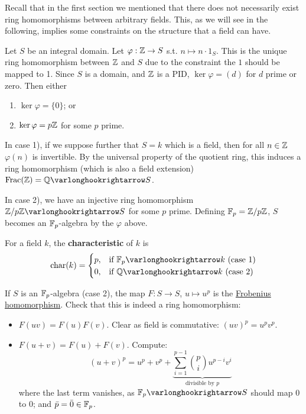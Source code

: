 \documentclass{article}
\begin{document}
\textstart
Recall that in the first section we mentioned that there does not necessarily exist ring homomorphisms between arbitrary fields. This, as we will see in the following, implies some constraints on the structure that a field can have.

Let $S$ be an integral domain. Let $\varphi: \mathbb{Z} \to S$ s.t. $n \mapsto n \cdot 1_S$. This is the unique ring homomorphism between $\mathbb{Z}$ and $S$ due to the constraint the $1$ should be mapped to 1. Since $S$ is a domain, and $\mathbb{Z}$ is a PID, $\ker \varphi = (d)$ for $d$ prime or zero. Then either 
\begin{enumerate}[label=\arabic*)]
    \item $\ker \varphi = \{0\}$; or
    \item $\ker \varphi = p\mathbb{Z}$ for some $p$ prime.
\end{enumerate}

In case 1), if we suppose further that $S = k$ which is a field, then for all $n \in \mathbb{Z}$ $\varphi(n)$ is invertible. By the universal property of the quotient ring, this induces a ring homomorphism (which is also a field extension) $\Frac(\Z) = \Q \ext S$. 

In case 2), we have an injective ring homomorphism $\Z/p\Z \ext S$ for some $p$ prime. Defining $\mathbb{F}_p = \mathbb{Z}/p\mathbb{Z}$, $S$ becomes an $\mathbb{F}_p$-algebra by the $\varphi$ above. 

\begin{definition}[Characteristic]
    For a field $k$, the \textbf{characteristic} of $k$ is
    \[
        \fchar(k) = 
        \begin{cases}
            p, & \text{if $\F_p \ext k$ (case 1)} \\
            0, & \text{if $\Q \ext k$ (case 2)}
        \end{cases}
    \]
\end{definition}

\begin{remark}
    If $S$ is an $\mathbb{F}_p$-algebra (case 2), the map $F: S \to S$, $u \mapsto u^p$ is the \underline{Frobenius homomorphism}. Check that this is indeed a ring homomorphism:
    \begin{itemize}
        \item $F(uv) = F(u) F(v)$. Clear as field is commutative: $(uv)^p = u^p v^p$.
        \item $F(u + v) = F(u) + F(v)$. Compute: 
        \[
            (u + v)^p = u^p + v^p + \underbrace{\sum_{i = 1}^{p - 1} \binom{p}{i} u^{p-i} v^i}_{\text{divisible by $p$}}
        \]
        where the last term vanishes, as $\F_p \ext S$ should map $0$ to $0$; and $\bar{p} = \bar{0} \in \mathbb{F}_p$.
    \end{itemize}
\end{remark}
\end{document}

